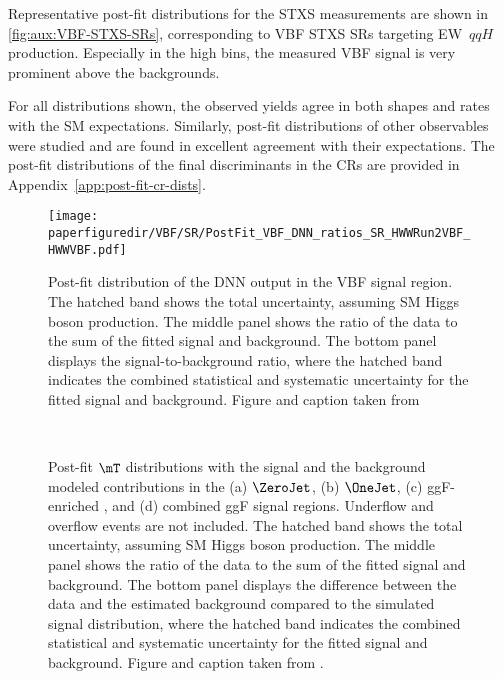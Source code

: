 Representative post-fit distributions for the STXS measurements are shown in \cref{fig:aux:VBF-STXS-SRs}, corresponding to VBF STXS SRs targeting EW~$qqH$ production. 
Especially in the high \mjj bins, the measured VBF signal is very prominent above the backgrounds. 

For all distributions shown, the observed yields agree in both shapes and rates with the SM expectations.
Similarly, post-fit distributions of other observables were studied and are found in excellent agreement with their expectations. The post-fit distributions of the final discriminants in the CRs are provided in Appendix~\ref{app:post-fit-cr-dists}. 

\begin{figure}[t]
  \centering
  \texttt{[image: \\paperfiguredir/VBF/SR/PostFit\_VBF\_DNN\_ratios\_SR\_HWWRun2VBF\_HWWVBF.pdf]}
  \caption[Post-fit distribution of the DNN output in the VBF signal region.]{
    Post-fit distribution of the DNN output in the VBF signal region.
    The hatched band shows the total uncertainty, assuming SM Higgs boson production.
    The middle panel shows the ratio of the data to the sum of the fitted signal and background.
    The bottom panel displays the signal-to-background ratio, where the hatched band indicates the combined statistical and systematic uncertainty for the fitted signal and background.
    Figure and caption taken from 
  }
  \label{fig:VBF_DNN}
\end{figure}

\begin{figure}[htb]
  \centering
   \\
  \caption[Post-fit $\mT$ distributions in the ggF categories.]{
    Post-fit $\mT$ distributions with the signal and the background modeled contributions
    in the (a) $\ZeroJet$, (b) $\OneJet$, (c) ggF-enriched \TwoJet, and (d) combined ggF signal regions. Underflow and overflow events are not included.
    The hatched band shows the total uncertainty, assuming SM Higgs boson production.
    The middle panel shows the ratio of the data to the sum of the fitted signal and background.
    The bottom panel displays the difference between the data and the estimated background compared to the simulated signal distribution, where the hatched band indicates the combined statistical and systematic uncertainty for the fitted signal and background.
    Figure and caption taken from . 
    \label{fig:ggF_MT}
  }
\end{figure}

